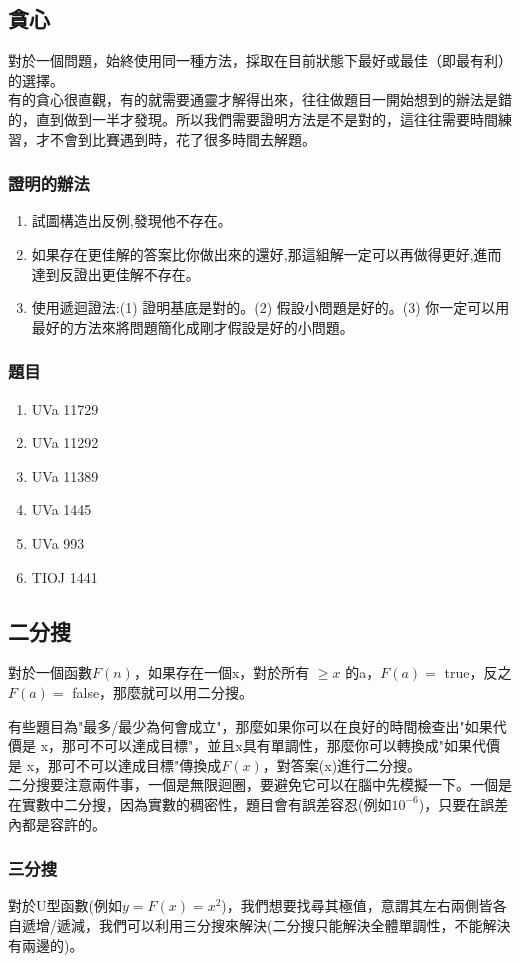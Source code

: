 \subsection{貪心}
對於一個問題，始終使用同一種方法，採取在目前狀態下最好或最佳（即最有利）的選擇。\\
有的貪心很直觀，有的就需要通靈才解得出來，往往做題目一開始想到的辦法是錯的，直到做到一半才發現。所以我們需要證明方法是不是對的，這往往需要時間練習，才不會到比賽遇到時，花了很多時間去解題。\\
\subsubsection{證明的辦法}
\begin{enumerate}
\item 試圖構造出反例,發現他不存在。
\item 如果存在更佳解的答案比你做出來的還好,那這組解一定可以再做得更好,進而達到反證出更佳解不存在。
\item 使用遞迴證法:(1) 證明基底是對的。(2) 假設小問題是好的。(3) 你一定可以用最好的方法來將問題簡化成剛才假設是好的小問題。
\end{enumerate}
\subsubsection{題目}
\begin{enumerate}
\item UVa 11729
\item UVa 11292
\item UVa 11389
\item UVa 1445
\item UVa 993
\item TIOJ 1441
\end{enumerate}
\subsection{二分搜}
對於一個函數$F(n)$，如果存在一個x，對於所有 $\geq x$ 的a，$F(a)=$ true，反之$F(a)=$ false，那麼就可以用二分搜。

有些題目為"最多/最少為何會成立"，那麼如果你可以在良好的時間檢查出"如果代價是 x，那可不可以達成目標"，並且x具有單調性，那麼你可以轉換成"如果代價是 x，那可不可以達成目標"傳換成$F(x)$，對答案(x)進行二分搜。\\
二分搜要注意兩件事，一個是無限迴圈，要避免它可以在腦中先模擬一下。一個是在實數中二分搜，因為實數的稠密性，題目會有誤差容忍(例如$10^{-6}$)，只要在誤差內都是容許的。
\subsubsection{三分搜}
對於U型函數(例如$y=F(x)=x^2$)，我們想要找尋其極值，意謂其左右兩側皆各自遞增/遞減，我們可以利用三分搜來解決(二分搜只能解決全體單調性，不能解決有兩邊的)。

